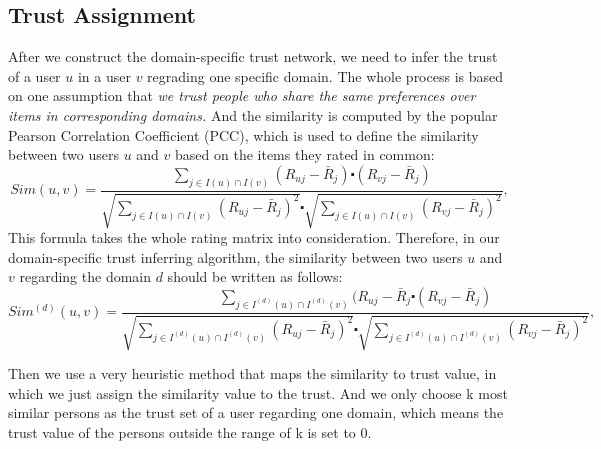 \subsection{Trust Assignment}
After we construct the domain-specific trust network, we need to infer the trust of a user $u$ in a user $v$ regrading one specific domain. The whole process is based on one assumption that \emph{we trust people who share the same preferences over items in corresponding domains.} And the similarity is computed by the popular Pearson Correlation Coefficient (PCC)\cite{breese1998empirical}, which is used to define the similarity between two users $u$ and $v$ based on the items they rated in common:
\begin{equation}
Sim(u, v) = \frac{\sum\limits_{j \in I(u) \cap I(v) }(R_{uj} - \bar{R}_j) \centerdot (R_{vj} - \bar{R}_j)}{\sqrt{\sum\limits_{j \in I(u) \cap I(v)}(R_{uj} - \bar{R}_j)^2} \centerdot \sqrt{\sum\limits_{j \in I(u) \cap I(v)}(R_{vj} - \bar{R}_j)^2}},
\end{equation}
This formula takes the whole rating matrix into consideration. Therefore, in our domain-specific trust inferring algorithm, the similarity between two users $u$ and $v$ regarding the domain $d$ should be written as follows:
\begin{equation}
Sim^{(d)}(u, v) = \frac{\sum\limits_{j \in I^{(d)}(u) \cap I^{(d)}(v) }(R_{uj} - \bar{R}_j \centerdot (R_{vj} - \bar{R}_j)}{\sqrt{\sum\limits_{j \in I^{(d)}(u) \cap I^{(d)}(v)}(R_{uj} - \bar{R}_j)^2} \centerdot \sqrt{\sum\limits_{j \in I^{(d)}(u) \cap I^{(d)}(v)}(R_{vj} - \bar{R}_j)^2}},
\end{equation}

Then we use a very heuristic method that maps the similarity to trust value, in which we just assign the similarity value to the trust. And we only choose k most similar persons as the trust set of a user regarding one domain, which means the trust value of the persons outside the range of k is set to $0$.

